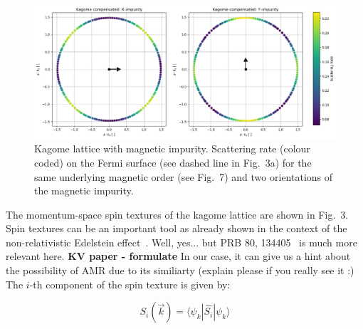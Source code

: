\documentclass[prb,showpacs,amsmath,amssymb,superscriptaddress,twocolumn,floatfix]{revtex4-1}
\begin{document}

\begin{figure}
\includegraphics[scale=0.27]{img/fig9.png}
\caption{%
Kagome lattice with magnetic impurity. Scattering rate (colour coded) on
the Fermi surface (see dashed line in Fig.~3a) for the same underlying
magnetic order (see Fig.~7) and two orientations of the magnetic impurity.}
\label{fig-09}
\end{figure}

The momentum-space spin textures of the kagome lattice %
are shown in Fig.~3.  %
Spin textures can be an important tool as already shown in the context of the non-relativistic Edelstein effect~\cite{Gonzalez-Hernandez:2024}.
{\color{red}Well, yes... but PRB 80, 134405~\cite{Trushin:2009_a} is much more relevant here. \textbf{KV paper - formulate}} In our case, it can give us a hint about the possibility of AMR due to its similiarty
{\color{red}(explain please if you really see it :)} The $i$-th component of the spin texture is given by:

\begin{equation}
	S_i (\vec{k}) = \langle \psi_k | \hat{S_i} | \psi_k \rangle
	\label{eq_spintexture}
\end{equation}
\end{document}
